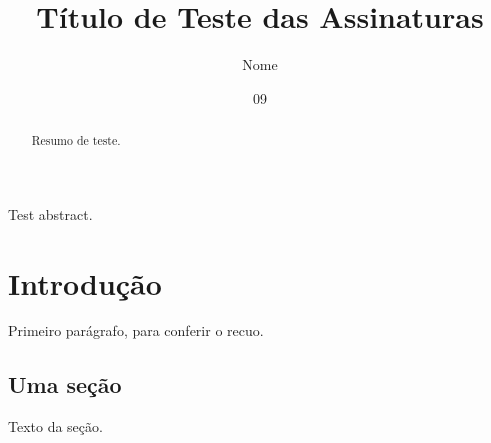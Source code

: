\documentclass[dsc,assinaturas]{coppe}
\title{Título de Teste das Assinaturas}
\author{Nome}{de Teste}
\date{09}{2026}
\begin{document}
  \maketitle
  \frontmatter
  \begin{abstract}
    Resumo de teste.
  \end{abstract}
  \begin{foreignabstract}
    Test abstract.
  \end{foreignabstract}
  \tableofcontents
  \mainmatter
  \chapter{Introdução}
    Primeiro parágrafo, para conferir o recuo.
  \section{Uma seção}
    Texto da seção.
\end{document}

